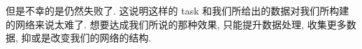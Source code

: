 \documentclass[UTF8]{ctexart}
\begin{document}
	\begin{figure}[htbp]
	    \centering
	\end{figure}
	但是不幸的是仍然失败了. 这说明这样的 task 和我们所给出的数据对我们所构建的网络来说太难了. 想要达成我们所说的那种效果, 只能提升数据处理, 收集更多数据, 抑或是改变我们的网络的结构.
\end{document}
